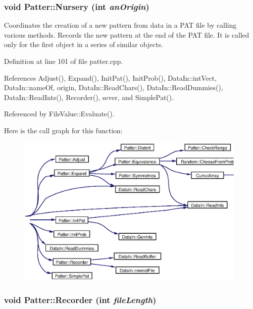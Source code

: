 \subsubsection{\setlength{\rightskip}{0pt plus 5cm}void Patter::Nursery (int {\em an\-Origin})}\label{classPatter_a5}


Coordinates the creation of a new pattern from data in a PAT file by calling various methods. Records the new pattern at the end of the PAT file. It is called only for the first object in a series of similar objects. 

Definition at line 101 of file patter.cpp.

References Adjust(), Expand(), Init\-Pat(), Init\-Prob(), Data\-In::int\-Vect, Data\-In::name\-Of, origin, Data\-In::Read\-Chars(), Data\-In::Read\-Dummies(), Data\-In::Read\-Ints(), Recorder(), sever, and Simple\-Pat().

Referenced by File\-Value::Evaluate().

Here is the call graph for this function:\begin{figure}[H]
\begin{center}
\leavevmode
\includegraphics[width=401pt]{classPatter_a5_cgraph}
\end{center}
\end{figure}
\subsubsection{\setlength{\rightskip}{0pt plus 5cm}void Patter::Recorder (int {\em file\-Length})\hspace{0.3cm}{\tt  [private]}}\label{classPatter_d16}


